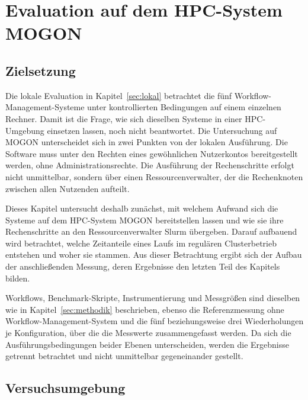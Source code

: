 
\lstset{breaklines=true, breakatwhitespace=false}

\chapter{Evaluation auf dem HPC-System MOGON}
\label{sec:mogon}
\section{Zielsetzung}
\label{sec:mogon:ziel}

Die lokale Evaluation in Kapitel~\ref{sec:lokal} betrachtet die fünf
Workflow-Management-Systeme unter kontrollierten Bedingungen auf einem einzelnen
Rechner. Damit ist die Frage, wie sich dieselben Systeme in einer
HPC-Umgebung einsetzen lassen, noch nicht beantwortet. Die Untersuchung auf MOGON unterscheidet sich in zwei Punkten von der lokalen Ausführung. Die Software muss unter den Rechten eines gewöhnlichen
Nutzerkontos bereitgestellt werden, ohne Administrationsrechte.
Die Ausführung der Rechenschritte erfolgt nicht unmittelbar,
sondern über einen Ressourcenverwalter, der die Rechenknoten
zwischen allen Nutzenden aufteilt.

Dieses Kapitel untersucht deshalb zunächst, mit welchem Aufwand
sich die Systeme auf dem HPC-System MOGON bereitstellen lassen und
wie sie ihre Rechenschritte an den Ressourcenverwalter Slurm
übergeben. Darauf aufbauend wird betrachtet, welche Zeitanteile
eines Laufs im regulären Clusterbetrieb entstehen und woher sie
stammen. Aus dieser Betrachtung ergibt sich der Aufbau der
anschließenden Messung, deren Ergebnisse den letzten Teil des
Kapitels bilden.

\begin{sloppypar}
Workflows, Benchmark-Skripte, Instrumentierung und Messgrößen sind
dieselben wie in Kapitel~\ref{sec:methodik} beschrieben, ebenso die
Referenzmessung ohne Workflow-Management-System und die fünf
beziehungsweise drei Wiederholungen je Konfiguration, über die die
Messwerte zusammengefasst werden. Da sich die
Ausführungsbedingungen beider Ebenen unterscheiden, werden die
Ergebnisse getrennt betrachtet und nicht unmittelbar
gegeneinander gestellt.
\end{sloppypar}


\section{Versuchsumgebung}
\label{sec:mogon:umgebung}

